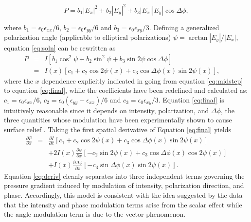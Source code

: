 \documentclass[aps, prl, twocolumn, groupedaddress]{revtex4-1}
\begin{document}
\begin{equation}
\label{eq:soln}
P = b_1\left|E_x\right|^2 + b_2\left|E_y\right|^2 +b_3
\left|E_x\right|\left|E_y\right|\cos{\Delta\phi},
\end{equation}


where $b_1 = \epsilon_0 \epsilon_{xx} / 6$, $b_2 =\epsilon_0
\epsilon_{yy} / 6$ and $b_3 = \epsilon_0 \epsilon_{xy} / 3$.
Defining a generalized polarization angle (applicable to elliptical polarizations)
$\psi=\arctan\left|E_y\right|/\left|E_x\right|$, equation
\ref{eq:soln} can be rewritten as
\begin{eqnarray}
P & = & I\left[b_1\cos^2\psi+b_2\sin^2\psi+b_3\sin2\psi\cos\Delta\phi\right] \ \ \ \ \ \label{eq:midstep}\\
& = & I(x)\left[c_1+c_2\cos2\psi(x)+c_3\cos\Delta\phi(x)\sin2\psi(x)\right]\mathrm{,} \ \
\ \ \ \  \label{eq:final}
\end{eqnarray}
where the $x$ dependence explicitly indicated in going from equation
\ref{eq:midstep} to equation \ref{eq:final}, while the coefficients
have been redefined and calculated as: $c_1 = \epsilon_0 \epsilon_{xx}
/ 6$, $c_2 =\epsilon_0 (\epsilon_{yy} - \epsilon_{xx}) / 6$ and $c_3 =
\epsilon_0 \epsilon_{xy} / 3$. Equation \ref{eq:final} is intuitively
reasonable since it depends on intensity, polarization, and
$\Delta\phi$, the three quantities whose modulation have been
experimentally shown to cause surface relief \cite{tanaka,
saliminia}. Taking the first spatial derivative of Equation
\ref{eq:final} yields
\begin{eqnarray}
\frac{\partial P}{\partial x}& = &\frac{\partial I}{\partial x}\left[c_1+c_2\cos2\psi(x)+c_3\cos\Delta\phi(x)\sin2\psi(x)\right] \nonumber\\
&&+2I(x)\frac{\partial \psi}{\partial x} \left[-c_2\sin2\psi(x)+c_3\cos\Delta\phi(x)\cos2\psi(x)\right] \nonumber\\
&&+I(x)\frac{\partial \Delta\phi}{\partial x}
\left[-c_3\sin\Delta\phi(x)\sin2\psi(x)\right] \mathrm{.} \label{eq:deriv}
\end{eqnarray}
Equation \ref{eq:deriv} cleanly separates into three independent terms
governing the pressure gradient induced by modulation of intensity,
polarization direction, and phase.  Accordingly, this model is
consistent with the idea suggested by the data that the intensity and
phase modulation terms arise from the scalar effect while the angle
modulation term is due to the vector phenomenon.
\end{document}
